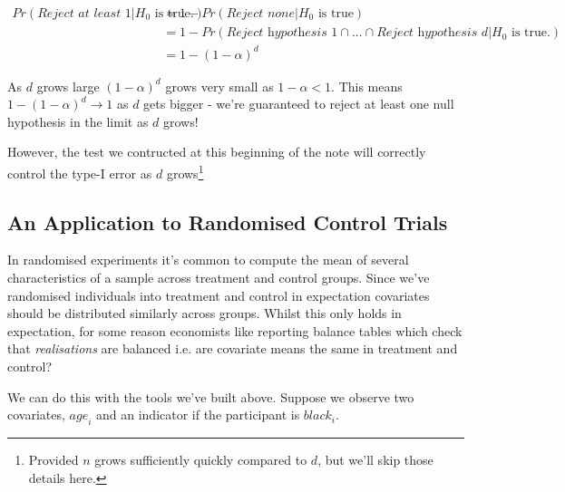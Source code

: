 \documentclass{article}
\newtheorem{corollary}{Corollary}[theorem]
\begin{document}
    \begin{align*}
        Pr(\textit{Reject at least } 1 | H_0 \text{ is true.}) &= 1 - Pr(\textit{Reject none} | H_0 \text{ is true}) \\
        &= 1 - Pr(\textit{Reject hypothesis 1} \cap  ... \cap \textit{Reject hypothesis d} | H_0 \text{ is true.}) \\
        &= 1 - (1 - \alpha)^d
    \end{align*}


    As $d$ grows large $(1 - \alpha)^d$ grows very small as $1 - \alpha < 1$. This means
    $1 - (1 - \alpha)^d \rightarrow 1$ as $d$ gets bigger - we're guaranteed to 
    reject at least one null hypothesis in the limit as $d$ grows!


    However, the test we contructed at this beginning of the note will correctly 
    control the type-I error as $d$ grows\footnote{Provided $n$ grows sufficiently 
    quickly compared to $d$, but we'll skip those details here.}




    \subsection*{An Application to Randomised Control Trials}


    In randomised experiments it's common to compute the mean of several 
    characteristics of a sample across treatment and control groups.  Since we've
    randomised individuals into treatment and control in expectation covariates 
    should be distributed similarly across groups. Whilst this only holds in 
    expectation, for some reason economists like reporting balance tables which 
    check that \textit{realisations} are balanced i.e. are covariate means the same 
    in treatment and control?


    We can do this with the tools we've built above. Suppose we observe two 
    covariates, $\textit{age}_i$ and an indicator if the participant is $\textit{black}_i$.
    
    
    
    
    
    
    
    
    
\end{document}
